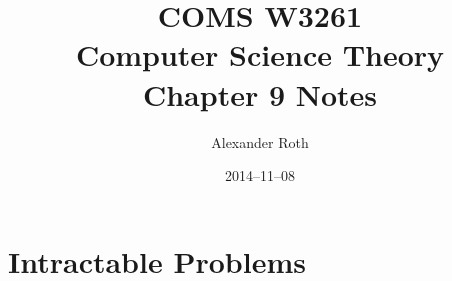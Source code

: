 \documentclass[]{article}
\begin{document}
\title{COMS W3261 \\ Computer Science Theory \\ Chapter 9 Notes}
\author{Alexander Roth}
\date{2014--11--08}
\maketitle
\theoremstyle{definition}
\newtheorem{thm}{Theorem}
\section*{Intractable Problems}
\end{document}
